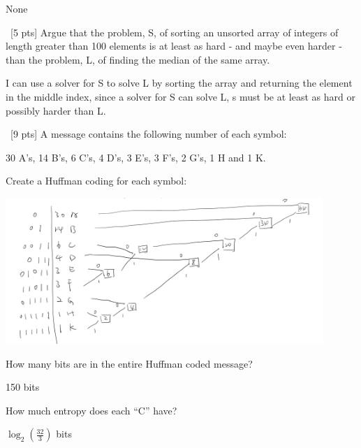\documentclass[12pt]{article}
\newenvironment{sol}[1][Solution]{\begin{trivlist}\item[\hskip\labelsep {\bfseries #1:}]}{\end{trivlist}}
\begin{document}
\begin{enumerate}
\begin{enumerate}
\begin{sol}
            None
        \end{sol}
    \end{enumerate}
    \item \ [5 pts] Argue that the problem, S, of sorting an unsorted array of integers of length greater than 100 elements is at least as hard - and maybe even harder - than the problem, L, of finding the median of the same array.
    \begin{sol}
    I can use a solver for S to solve L by sorting the array and returning the element in the middle index, since a solver for S can solve L, s must be at least as hard or possibly harder than L.
    \end{sol}

    \item \ [9 pts] A message contains the following number of each symbol:
    \begin{center}
        30 A’s, 14 B’s, 6 C's, 4 D's, 3 E's, 3 F's, 2 G's, 1 H and 1 K.
    \end{center}
    \begin{enumerate}
        \item Create a Huffman coding for each symbol:
                        \begin{center}
    \includegraphics[width=0.9\textwidth]{p4.jpeg}
    \end{center} 
        \item How many bits are in the entire Huffman coded message?
        \begin{sol}
            150 bits
        \end{sol}
        \item How much entropy does each “C” have?
        \begin{sol}
            $\log_2(\frac{32}{3})$ bits
        \end{sol}
    \end{enumerate}


\end{enumerate}
\end{document}

